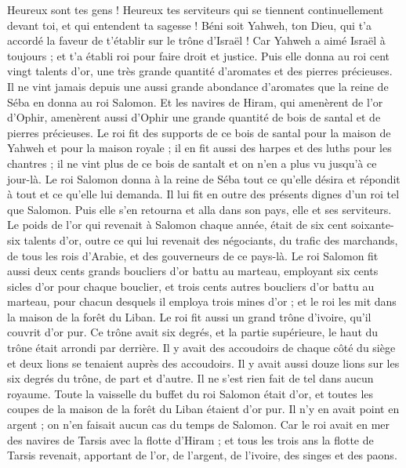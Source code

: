 \begin{multicols}{2}
Heureux sont tes gens ! Heureux tes serviteurs qui se tiennent continuellement devant toi, et qui entendent ta sagesse !
Béni soit Yahweh, ton Dieu, qui t’a accordé la faveur de t’établir sur le trône d'Israël ! Car Yahweh a aimé Israël à toujours ; et t'a établi roi pour faire droit et justice.
Puis elle donna au roi cent vingt talents d'or, une très grande quantité d’aromates et des pierres précieuses. Il ne vint jamais depuis une aussi grande abondance d’aromates que la reine de Séba en donna au roi Salomon.
Et les navires de Hiram, qui amenèrent de l'or d'Ophir, amenèrent aussi d’Ophir une grande quantité de bois de santal et de pierres précieuses.
Le roi fit des supports de ce bois de santal pour la maison de Yahweh et pour la maison royale ; il en fit aussi des harpes et des luths pour les chantres ; il ne vint plus de ce bois de santalt et on n’en a plus vu jusqu'à ce jour-là.
Le roi Salomon donna à la reine de Séba tout ce qu'elle désira et répondit à tout et ce qu'elle lui demanda. Il lui fit en outre des présents dignes d'un roi tel que Salomon. Puis elle s'en retourna et alla dans son pays, elle et ses serviteurs.
Le poids de l'or qui revenait à Salomon chaque année, était de six cent soixante-six talents d'or,
outre ce qui lui revenait des négociants, du trafic des marchands, de tous les rois d'Arabie, et des gouverneurs de ce pays-là.
Le roi Salomon fit aussi deux cents grands boucliers d'or battu au marteau, employant six cents sicles d'or pour chaque bouclier,
et trois cents autres boucliers d'or battu au marteau, pour chacun desquels il employa trois mines d'or ; et le roi les mit dans la maison de la forêt du Liban.
Le roi fit aussi un grand trône d'ivoire, qu'il couvrit d’or pur.
Ce trône avait six degrés, et la partie supérieure, le haut du trône était arrondi par derrière. Il y avait des accoudoirs de chaque côté du siège et deux lions se tenaient auprès des accoudoirs.
Il y avait aussi douze lions sur les six degrés du trône, de part et d'autre. Il ne s'est rien fait de tel dans aucun royaume.
Toute la vaisselle du buffet du roi Salomon était d'or, et toutes les coupes de la maison de la forêt du Liban étaient d’or pur. Il n'y en avait point en argent ; on n’en faisait aucun cas du temps de Salomon.
Car le roi avait en mer des navires de Tarsis avec la flotte d'Hiram ; et tous les trois ans la flotte de Tarsis revenait, apportant de l'or, de l'argent, de l'ivoire, des singes et des paons.

\end{multicols}
